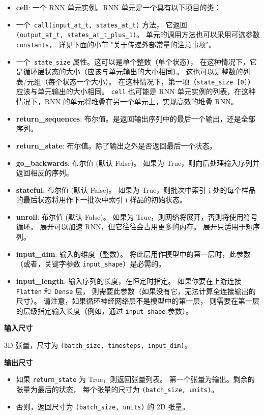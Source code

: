 \begin{itemize}
\tightlist
\item
  \textbf{cell}: 一个 RNN 单元实例。RNN 单元是一个具有以下项目的类：
\item
  一个~\texttt{call(input\_at\_t,\ states\_at\_t)} 方法， 它返回
  \texttt{(output\_at\_t,\ states\_at\_t\_plus\_1)}。
  单元的调用方法也可以采用可选参数 \texttt{constants}， 详见下面的小节
  "关于传递外部常量的注意事项"。
\item
  一个~\texttt{state\_size} 属性。这可以是单个整数（单个状态），
  在这种情况下，它是循环层状态的大小（应该与单元输出的大小相同）。
  这也可以是整数的列表/元组（每个状态一个大小）。
  在这种情况下，第一项（\texttt{state\_size\ {[}0{]}}）应该与单元输出的大小相同。
  \texttt{cell} 也可能是 RNN 单元实例的列表，在这种情况下，RNN
  的单元将堆叠在另一个单元上，实现高效的堆叠 RNN。
\item
  \textbf{return\_sequences}:
  布尔值。是返回输出序列中的最后一个输出，还是全部序列。
\item
  \textbf{return\_state}: 布尔值。除了输出之外是否返回最后一个状态。
\item
  \textbf{go\_backwards}: 布尔值 (默认 False)。 如果为
  True，则向后处理输入序列并返回相反的序列。
\item
  \textbf{stateful}: 布尔值 (默认 False)。 如果为 True，则批次中索引 i
  处的每个样品的最后状态将用作下一批次中索引 i 样品的初始状态。
\item
  \textbf{unroll}: 布尔值 (默认 False)。 如果为
  True，则网络将展开，否则将使用符号循环。 展开可以加速
  RNN，但它往往会占用更多的内存。 展开只适用于短序列。
\item
  \textbf{input\_dim}: 输入的维度（整数）。
  将此层用作模型中的第一层时，此参数（或者，关键字参数
  \texttt{input\_shape}）是必需的。
\item
  \textbf{input\_length}: 输入序列的长度，在恒定时指定。
  如果你要在上游连接 \texttt{Flatten} 和~\texttt{Dense} 层，
  则需要此参数（如果没有它，无法计算全连接输出的尺寸）。
  请注意，如果循环神经网络层不是模型中的第一层，
  则需要在第一层的层级指定输入长度（例如，通过 \texttt{input\_shape}
  参数）。
\end{itemize}

\textbf{输入尺寸}

3D 张量，尺寸为 \texttt{(batch\_size,\ timesteps,\ input\_dim)}。

\textbf{输出尺寸}

\begin{itemize}
\tightlist
\item
  如果 \texttt{return\_state} 为 True，则返回张量列表。
  第一个张量为输出。剩余的张量为最后的状态， 每个张量的尺寸为
  \texttt{(batch\_size,\ units)}。
\item
  否则，返回尺寸为 \texttt{(batch\_size,\ units)} 的 2D 张量。
\end{itemize}

